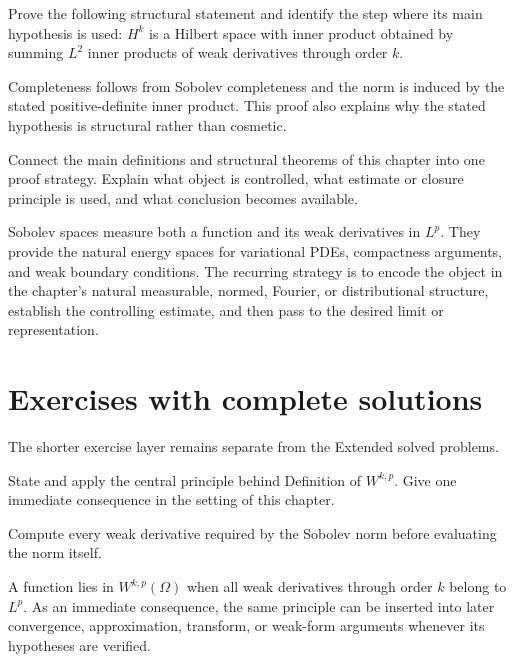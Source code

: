 \begin{problem}\label{prob:iii21-problem-11}
Prove the following structural statement and identify the step where its main hypothesis is used: $H^k$ is a Hilbert space with inner product obtained by summing $L^2$ inner products of weak derivatives through order $k$.
\end{problem}
\begin{solution}
Completeness follows from Sobolev completeness and the norm is induced by the stated positive-definite inner product. This proof also explains why the stated hypothesis is structural rather than cosmetic.
\end{solution}

\begin{problem}\label{prob:iii21-problem-12}
Connect the main definitions and structural theorems of this chapter into one proof strategy. Explain what object is controlled, what estimate or closure principle is used, and what conclusion becomes available.
\end{problem}
\begin{solution}
Sobolev spaces measure both a function and its weak derivatives in $L^p$. They provide the natural energy spaces for variational PDEs, compactness arguments, and weak boundary conditions. The recurring strategy is to encode the object in the chapter's natural measurable, normed, Fourier, or distributional structure, establish the controlling estimate, and then pass to the desired limit or representation.
\end{solution}
\section{Exercises with complete solutions}
The shorter exercise layer remains separate from the Extended solved problems.

\begin{exercise}\label{exr:iii21-01}
State and apply the central principle behind Definition of $W^{k,p}$. Give one immediate consequence in the setting of this chapter.
\end{exercise}
\begin{hint}
Compute every weak derivative required by the Sobolev norm before evaluating the norm itself.
\end{hint}
\begin{solution}
A function lies in $W^{k,p}(\Omega)$ when all weak derivatives through order $k$ belong to $L^p$. As an immediate consequence, the same principle can be inserted into later convergence, approximation, transform, or weak-form arguments whenever its hypotheses are verified.
\end{solution}

